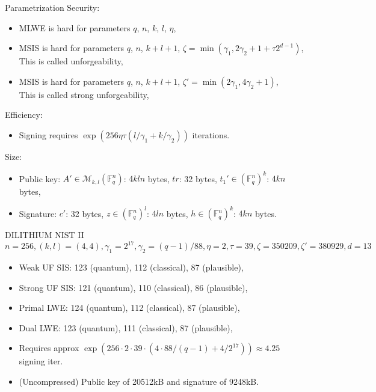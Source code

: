 \documentclass[aspectratio=169]{beamer}
\begin{document}
\begin{frame}{Parametrization}
    Security:
    \begin{itemize}
        \item MLWE is hard for parameters $q$, $n$, $k$, $l$, $\eta$,
        \item MSIS is hard for parameters $q$, $n$, $k+l+1$, $\zeta = \min(\gamma_1, 2\gamma_2+1+\tau 2^{d-1})$,\\
        This is called unforgeability,
        \item MSIS is hard for parameters $q$, $n$, $k+l+1$, $\zeta' = \min(2\gamma_1, 4\gamma_2+1)$,\\
        This is called strong unforgeability,
    \end{itemize}
    \pause
    Efficiency:
    \begin{itemize}
        \item Signing requires $\exp(256\eta\tau(l/\gamma_1 + k/\gamma_2))$ iterations.
    \end{itemize}
    \pause
    Size:
    \begin{itemize}
        \item Public key: $A'\in\mathcal M_{k,l}(\mathbb F_q^n)$: $4kln$ bytes, $tr$: 32 bytes, $t_1' \in (\mathbb F_q^n)^k$: $4kn$ bytes,
        \item Signature: $c'$: 32 bytes, $z \in (\mathbb F_q^n)^l$: $4ln$ bytes, $h \in (\mathbb F_q^n)^k$: $4kn$ bytes.
    \end{itemize}
\end{frame}

\begin{frame}{DILITHIUM NIST II} 
    $$n=256,  (k,l) = (4,4), \gamma_1 = 2^{17}, \gamma_2 = (q-1)/88, \eta = 2, \tau = 39, \zeta = 350209, \zeta' = 380929, d = 13$$
    \begin{itemize}
        \item Weak UF SIS: 123 (quantum),  112 (classical), 87 (plausible),
        \item Strong UF SIS: 121 (quantum),  110 (classical), 86 (plausible),
        \item Primal LWE: 124 (quantum),  112 (classical), 87 (plausible),
        \item Dual LWE: 123 (quantum),  111 (classical), 87 (plausible),
        \item Requires approx $\exp(256\cdot 2 \cdot 39\cdot(4\cdot 88 / (q-1) + 4 / 2^{17})) \approx 4.25$ signing iter.
        \item (Uncompressed) Public key of 20512kB and signature of 9248kB. 
    \end{itemize}
\end{frame}
\end{document}
